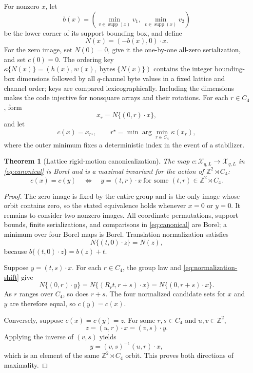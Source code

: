 \documentclass[11pt]{article}
\newtheorem{theorem}{Theorem}[section]
\theoremstyle{definition}
\theoremstyle{remark}
\DeclareMathOperator{\supp}{supp}
\newcommand{\cX}{\mathcal X}
\newcommand{\bZ}{\mathbb Z}
\newcommand{\1}{\mathbf 1}
\begin{document}
For nonzero \(x\), let
\[
 b(x)=\left(\min_{v\in\supp(x)}v_1,\ 
            \min_{v\in\supp(x)}v_2\right)
\]
be the lower corner of its support bounding box, and define
\[
 N(x)=(-b(x),0)\cdot x.
\]
For the zero image, set \(N(0)=0\), give it the one-by-one all-zero
serialization, and set \(c(0)=0\).
The ordering key
\(\kappa\{N(x)\}=(h(x),w(x),\operatorname{bytes}\{N(x)\})\) contains the
integer bounding-box dimensions followed by all \(q\)-channel byte values in a
fixed lattice and channel order; keys are compared lexicographically.
Including the dimensions makes the code injective for nonsquare arrays and
their rotations.  For each \(r\in C_4\), form
\[
  x_r=N\{(0,r)\cdot x\},
\]
and let
\begin{equation}\label{eq:canonical}
  c(x)=x_{r^\star},\qquad
  r^\star=\min\arg\min_{r\in C_4}\kappa(x_r),
\end{equation}
where the outer minimum fixes a deterministic index in the event of a
stabilizer.

\begin{theorem}[Lattice rigid-motion canonicalization]\label{thm:lattice}
The map \(c:\cX_{q,L}\to\cX_{q,L}\) in \eqref{eq:canonical} is Borel and is a maximal
invariant for the action of \(\bZ^2\rtimes C_4\):
\[
 c(x)=c(y)\quad\Longleftrightarrow\quad
 y=(t,r)\cdot x\ \text{for some }(t,r)\in\bZ^2\rtimes C_4 .
\]
\end{theorem}

\begin{proof}
The zero image is fixed by the entire group and is the only image whose orbit
contains zero, so the stated equivalence holds whenever \(x=0\) or \(y=0\).
It remains to consider two nonzero images.  All coordinate permutations,
support bounds, finite serializations, and comparisons in
\eqref{eq:canonical} are Borel; a minimum over four Borel maps is Borel.
Translation normalization satisfies
\begin{equation}\label{eq:normalization-shift}
 N\{(t,0)\cdot z\}=N(z),
\end{equation}
because \(b\{(t,0)\cdot z\}=b(z)+t\).

Suppose \(y=(t,s)\cdot x\).  For each \(r\in C_4\), the group law and
\eqref{eq:normalization-shift} give
\[
 N\{(0,r)\cdot y\}
 =N\{(R_rt,r+s)\cdot x\}
 =N\{(0,r+s)\cdot x\}.
\]
As \(r\) ranges over \(C_4\), so does \(r+s\).  The four normalized candidate
sets for \(x\) and \(y\) are therefore equal, so \(c(y)=c(x)\).

Conversely, suppose \(c(x)=c(y)=z\).  For some \(r,s\in C_4\) and
\(u,v\in\bZ^2\),
\[
 z=(u,r)\cdot x=(v,s)\cdot y.
\]
Applying the inverse of \((v,s)\) yields
\[
 y=(v,s)^{-1}(u,r)\cdot x,
\]
which is an element of the same \(\bZ^2\rtimes C_4\) orbit.  This proves both
directions of maximality.
\end{proof}
\end{document}
